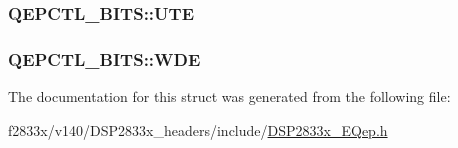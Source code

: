 \subsubsection[{U\+T\+E}]{ Q\+E\+P\+C\+T\+L\+\_\+\+B\+I\+T\+S\+::\+U\+T\+E}\label{struct_q_e_p_c_t_l___b_i_t_s_a69a58c7012dfb810361ecadfc215b2b4}
\hypertarget{struct_q_e_p_c_t_l___b_i_t_s_a847775b55c5d81d05dcd1de1bca52c09}{}
\subsubsection[{W\+D\+E}]{ Q\+E\+P\+C\+T\+L\+\_\+\+B\+I\+T\+S\+::\+W\+D\+E}\label{struct_q_e_p_c_t_l___b_i_t_s_a847775b55c5d81d05dcd1de1bca52c09}


The documentation for this struct was generated from the following file\+:\begin{DoxyCompactItemize}
\item 
f2833x/v140/\+D\+S\+P2833x\+\_\+headers/include/\hyperlink{_d_s_p2833x___e_qep_8h}{D\+S\+P2833x\+\_\+\+E\+Qep.\+h}\end{DoxyCompactItemize}
